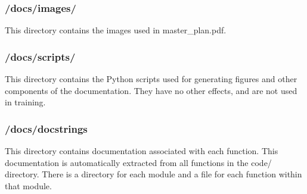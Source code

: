 \subsubsection{{\ttfamily /docs/images/}}
This directory contains the images used in master\_plan.pdf.
\subsubsection{{\ttfamily /docs/scripts/}}
This directory contains the Python scripts used for generating figures and other components of the documentation. They have no other effects, and are not used in training.
\subsubsection{{\ttfamily /docs/docstrings}}
This directory contains documentation associated with each function. This documentation is automatically extracted from all functions in the {\ttfamily code/} directory. There is a directory for each module and a file for each function within that module.